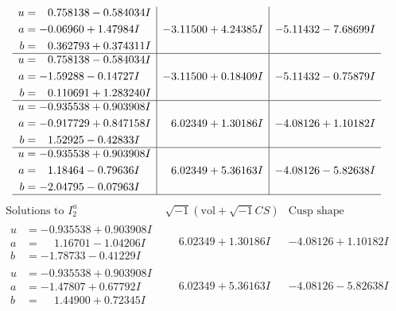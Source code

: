 \documentclass[1p]{elsarticle_modified}
\theoremstyle{definition}
\newcommand{\I}{\sqrt{-1}}
\begin{document}
$$\begin{array}{c|c|c}
\begin{aligned}
u &= \phantom{-}0.758138 - 0.584034 I \\
a &= -0.06960 + 1.47984 I \\
b &= \phantom{-}0.362793 + 0.374311 I\end{aligned}
 & -3.11500 + 4.24385 I & -5.11432 - 7.68699 I \\ \hline\begin{aligned}
u &= \phantom{-}0.758138 - 0.584034 I \\
a &= -1.59288 - 0.14727 I \\
b &= \phantom{-}0.110691 + 1.283240 I\end{aligned}
 & -3.11500 + 0.18409 I & -5.11432 - 0.75879 I \\ \hline\begin{aligned}
u &= -0.935538 + 0.903908 I \\
a &= -0.917729 + 0.847158 I \\
b &= \phantom{-}1.52925 - 0.42833 I\end{aligned}
 & \phantom{-}6.02349 + 1.30186 I & -4.08126 + 1.10182 I \\ \hline\begin{aligned}
u &= -0.935538 + 0.903908 I \\
a &= \phantom{-}1.18464 - 0.79636 I \\
b &= -2.04795 - 0.07963 I\end{aligned}
 & \phantom{-}6.02349 + 5.36163 I & -4.08126 - 5.82638 I\\
 \hline 
 \end{array}$$\newpage$$\begin{array}{c|c|c}  
\text{Solutions to }I^u_{2}& \I (\text{vol} + \sqrt{-1}CS) & \text{Cusp shape}\\
 \hline 
\begin{aligned}
u &= -0.935538 + 0.903908 I \\
a &= \phantom{-}1.16701 - 1.04206 I \\
b &= -1.78733 - 0.41229 I\end{aligned}
 & \phantom{-}6.02349 + 1.30186 I & -4.08126 + 1.10182 I \\ \hline\begin{aligned}
u &= -0.935538 + 0.903908 I \\
a &= -1.47807 + 0.67792 I \\
b &= \phantom{-}1.44900 + 0.72345 I\end{aligned}
 & \phantom{-}6.02349 + 5.36163 I & -4.08126 - 5.82638 I \\ \hline\begin{aligned}

\end{aligned}
\end{array}$$
\end{document}
